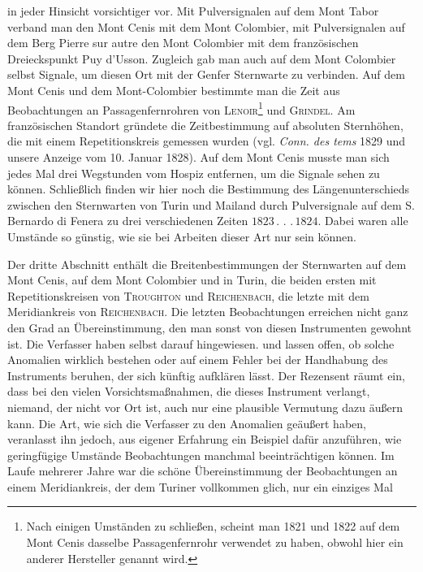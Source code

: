 %
in jeder Hinsicht vorsichtiger vor. Mit Pulversignalen auf dem Mont Tabor verband man den Mont Cenis mit dem Mont Colombier, mit Pulversignalen auf dem Berg Pierre sur autre den Mont Colombier mit dem französischen Dreieckspunkt Puy d’Usson. Zugleich gab man auch auf dem Mont Colombier selbst Signale, um diesen Ort mit der Genfer Sternwarte zu verbinden. Auf dem Mont Cenis und dem Mont-Colombier bestimmte man die Zeit aus Beobachtungen an Passagenfernrohren von \textsc{Lenoir}\footnote{Nach einigen Umständen zu schließen, scheint man 1821 und 1822 auf dem Mont Cenis dasselbe Passagenfernrohr verwendet zu haben, obwohl hier ein anderer Hersteller genannt wird.} und \textsc{Grindel}. Am französischen Standort gründete die Zeitbestimmung auf absoluten Sternhöhen, die mit einem Repetitionskreis gemessen wurden (vgl. \textit{Conn. des tems} 1829 und unsere Anzeige vom 10. Januar 1828). Auf dem Mont Cenis musste man sich jedes Mal drei Wegstunden vom Hospiz entfernen, um die Signale sehen zu können. Schließlich finden wir hier noch die Bestimmung des Längenunterschieds zwischen den Sternwarten von Turin und Mailand durch Pulversignale auf dem S. Bernardo di Fenera zu drei verschiedenen Zeiten \(1823\mathpunct{.}\mathpunct{.}\mathpunct{.}1824\). Dabei waren alle Umstände so günstig, wie sie bei Arbeiten dieser Art nur sein können.

Der dritte Abschnitt enthält die Breitenbestimmungen der Sternwarten auf dem Mont Cenis, auf dem Mont Colombier und in Turin, die beiden ersten mit Repetitionskreisen von \textsc{Troughton} und \textsc{Reichenbach}, die letzte mit dem Meridiankreis von \textsc{Reichenbach}. Die letzten Beobachtungen erreichen nicht ganz den Grad an Übereinstimmung, den man sonst von diesen Instrumenten gewohnt ist. Die Verfasser haben selbst darauf hingewiesen. und lassen offen, ob solche Anomalien wirklich bestehen oder auf einem Fehler bei der Handhabung des Instruments beruhen, der sich künftig aufklären lässt. Der Rezensent räumt ein, dass bei den vielen Vorsichtsmaßnahmen, die dieses Instrument verlangt, niemand, der nicht vor Ort ist, auch nur eine plausible Vermutung dazu äußern kann. Die Art, wie sich die Verfasser zu den Anomalien geäußert haben, veranlasst ihn jedoch, aus eigener Erfahrung ein Beispiel dafür anzuführen, wie geringfügige Umstände Beobachtungen manchmal beeinträchtigen können. Im Laufe mehrerer Jahre war die schöne Übereinstimmung der Beobachtungen an einem Meridiankreis, der dem Turiner vollkommen glich, nur ein einziges Mal
